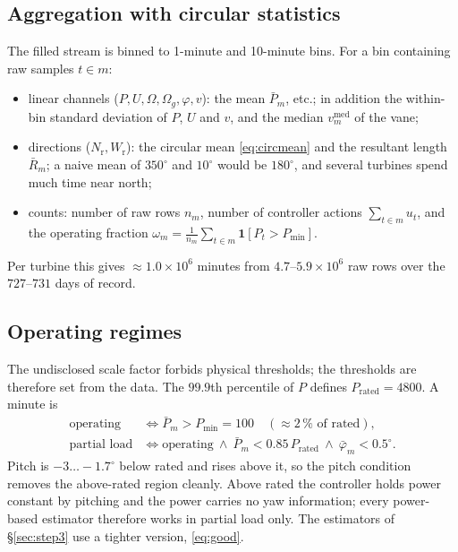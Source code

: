 \documentclass[11pt,a4paper]{article}
\theoremstyle{remark}
\newcommand{\med}{\operatorname{med}}
\newcommand{\dg}{^{\circ}}
\newcommand{\Wr}{W_{\mathrm{r}}}
\newcommand{\Nr}{N_{\mathrm{r}}}
\begin{document}
\subsection{Aggregation with circular statistics}\label{sec:agg}
The filled stream is binned to 1-minute and 10-minute bins. For a bin containing
raw samples $t\in m$:
\begin{itemize}
\item linear channels ($P,U,\Omega,\Omega_g,\varphi,v$): the mean $\bar P_m$, etc.;
      in addition the within-bin standard deviation of $P$, $U$ and $v$, and the
      median $v^{\med}_m$ of the vane;
\item directions ($\Nr,\Wr$): the circular mean \eqref{eq:circmean} and the
      resultant length $\bar R_m$; a naive mean of $350\dg$ and $10\dg$ would be
      $180\dg$, and several turbines spend much time near north;
\item counts: number of raw rows $n_m$, number of controller actions
      $\sum_{t\in m} u_t$, and the operating fraction
      $\omega_m = \frac1{n_m}\sum_{t\in m}\mathbf 1[P_t > P_{\min}]$.
\end{itemize}
Per turbine this gives $\approx1.0\times10^6$ minutes from $4.7$--$5.9\times10^6$
raw rows over the $727$--$731$ days of record.

\subsection{Operating regimes}\label{sec:regimes}
The undisclosed scale factor forbids physical thresholds; the thresholds are
therefore set from the data. The $99.9$th percentile of $P$ defines
$P_{\mathrm{rated}} = 4800$. A minute is
\begin{align}
  \text{operating}    &\iff \bar P_m > P_{\min} = 100 \quad(\approx2\,\% \text{ of rated}),\\
  \text{partial load} &\iff \text{operating} \ \wedge\ \bar P_m < 0.85\,P_{\mathrm{rated}} \ \wedge\ \bar\varphi_m < 0.5\dg .
  \label{eq:regime}
\end{align}
Pitch is $-3\ldots-1.7\dg$ below rated and rises above it, so the pitch condition
removes the above-rated region cleanly. Above rated the controller holds power
constant by pitching and the power carries no yaw information; every
power-based estimator therefore works in partial load only. The estimators of
\S\ref{sec:step3} use a tighter version, \eqref{eq:good}.
\end{document}
